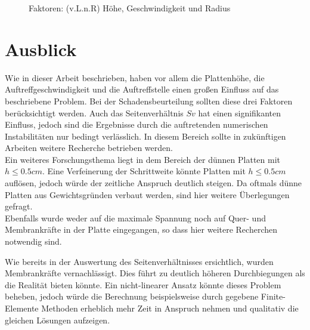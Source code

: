 \begin{figure}[H]%
	\centering
	\qquad
	\caption{Faktoren: (v.L.n.R) Höhe, Geschwindigkeit und Radius}%
	\label{fig:Faktoren}%
\end{figure}

\newpage

\section*{Ausblick}
\label{sec:Ausblick}

Wie in dieser Arbeit beschrieben, haben vor allem die Plattenhöhe, die Auftreffgeschwindigkeit und die Auftreffstelle einen großen Einfluss auf das beschriebene Problem. Bei der Schadensbeurteilung sollten diese drei Faktoren berücksichtigt werden. Auch das Seitenverhältnis $Sv$ hat einen signifikanten Einfluss, jedoch sind die Ergebnisse durch die auftretenden numerischen Instabilitäten nur bedingt verlässlich. In diesem Bereich sollte in zukünftigen Arbeiten weitere Recherche betrieben werden. \\
Ein weiteres Forschungsthema liegt in dem Bereich der dünnen Platten mit $h \leq 0.5 cm$. Eine Verfeinerung der Schrittweite könnte Platten mit $h \leq 0.5 cm$ auflösen, jedoch würde der zeitliche Anspruch deutlich steigen. Da oftmals dünne Platten aus Gewichtsgründen verbaut werden, sind hier weitere Überlegungen gefragt. \\
Ebenfalls wurde weder auf die maximale Spannung noch auf Quer- und Membrankräfte in der Platte eingegangen, so dass hier weitere Recherchen notwendig sind.

Wie bereits in der Auswertung des Seitenverhältnisses ersichtlich, wurden Membrankräfte vernachlässigt. Dies führt zu deutlich höheren Durchbiegungen als die Realität bieten könnte.
Ein nicht-linearer Ansatz könnte dieses Problem beheben, jedoch würde die Berechnung beispielsweise durch gegebene Finite-Elemente Methoden erheblich mehr Zeit in Anspruch nehmen und qualitativ die gleichen Lösungen aufzeigen.


